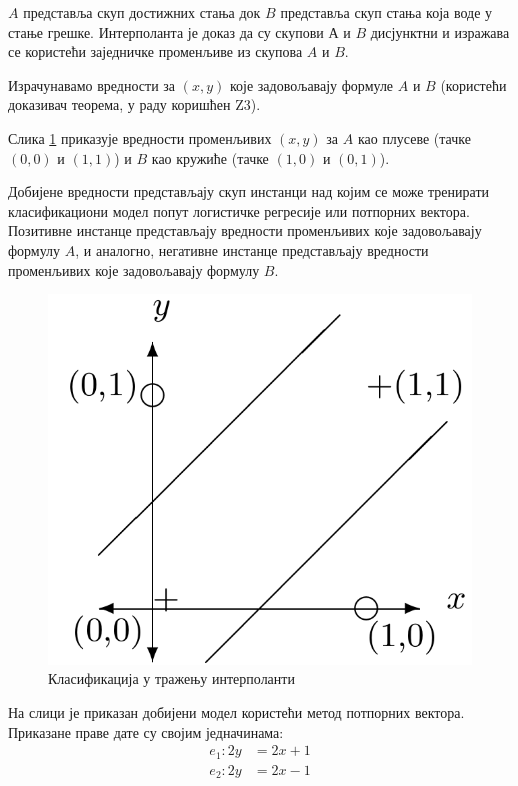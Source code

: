 \documentclass[a4paper]{article}
\begin{document}
{$A$ представља скуп достижних стања док $B$ представља скуп стања која воде у стање грешке. Интерполанта је доказ да су
скупови $А$ и $B$ дисјунктни и изражава се користећи заједничке променљиве из скупова $A$ и $B$.

Израчунавамо вредности за $(x, y)$ које задовољавају формуле $A$ и $B$ (користећи доказивач теорема, у раду \cite{Sharma_interpolantsas} коришћен Z3).

Слика \ref{fig:interpolant_svm} приказује вредности променљивих $(x, y)$ за $A$ као плусеве (тачке $(0, 0)$ и $(1, 1)$)
и $B$ као кружиће (тачке $(1, 0)$ и $(0, 1)$).

Добијене вредности представљају скуп инстанци над којим се може тренирати класификациони модел попут логистичке регресије или потпорних вектора.
Позитивне инстанце представљају вредности променљивих које задовољавају формулу $A$, и аналогно, негативне инстанце представљају вредности
променљивих које задовољавају формулу $B$.

\begin{figure}[h!]
\begin{center}
\includegraphics[scale=0.2]{./slike/interpolant.png}
\end{center}
\caption{Класификација у тражењу интерполанти}
\label{fig:interpolant_svm}
\end{figure}

На слици је приказан добијени модел користећи метод потпорних вектора. Приказане праве дате су својим једначинама:
\begin{equation*}
\begin{split}
    e_1: 2y &= 2x + 1 \\
    e_2: 2y &= 2x - 1
\end{split}
\end{equation*}

}
\end{document}
